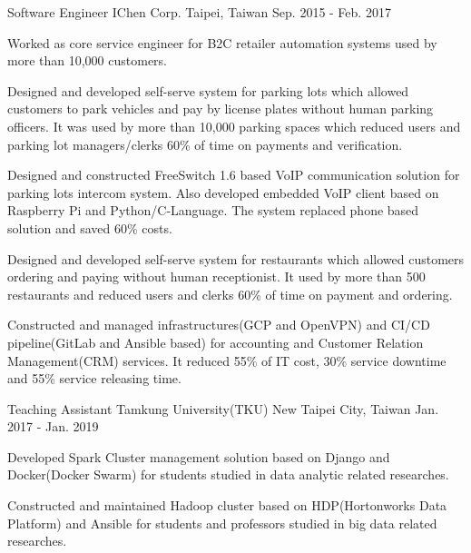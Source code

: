 \begin{cventries}
    \cventry
        {Software Engineer}
        {IChen Corp.}
        {Taipei, Taiwan}
        {Sep. 2015 - Feb. 2017}
        {
            \begin{cvitems}
                \item
                {
                    Worked as core service engineer for B2C retailer automation systems used by more than 10,000 customers.
                }
                \item
                {
                    Designed and developed self-serve system for parking lots which allowed customers to park vehicles and pay by license plates without human parking officers. It was used by more than 10,000 parking spaces which reduced users and parking lot managers/clerks 60\% of time on payments and verification.
                }
                \item
                {
                    Designed and constructed FreeSwitch 1.6 based VoIP communication solution for parking lots intercom system. Also developed embedded VoIP client based on Raspberry Pi and Python/C-Language. The system replaced phone based solution and saved 60\% costs.
                }
                \item
                {
                    Designed and developed self-serve system for restaurants which allowed customers ordering and paying without human receptionist. It used by more than 500 restaurants and reduced users and clerks 60\% of time on payment and ordering.
                }
                \item
                {
                    Constructed and managed infrastructures(GCP and OpenVPN) and CI/CD pipeline(GitLab and Ansible based) for accounting and Customer Relation Management(CRM) services. It reduced 55\% of IT cost, 30\% service downtime and 55\% service releasing time.
                }
            \end{cvitems}
        }
        
    \cventry
        {Teaching Assistant}
        {Tamkung University(TKU)}
        {New Taipei City, Taiwan}
        {Jan. 2017 - Jan. 2019}
        {
            \begin{cvitems}
                \item
                    {
                        Developed Spark Cluster management solution based on Django and Docker(Docker Swarm) for students studied in data analytic related researches.
                    }
                \item
                    {
                        Constructed and maintained Hadoop cluster based on HDP(Hortonworks Data Platform) and Ansible for students and professors studied in big data related researches.
                    }
            \end{cvitems}
        }
        

\end{cventries}

